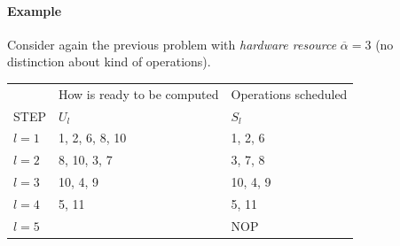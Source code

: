 \paragraph{Example}
Consider again the previous problem with \textit{hardware resource} $ \overline{\alpha} = 3 $ (no distinction about kind of operations).
\begin{center}
\begin{tabular}{l|l|l}
  \multicolumn{1}{l}{} & \multicolumn{1}{l}{How is ready to be computed}  & \multicolumn{1}{l}{Operations scheduled} \\
  STEP & $ U_{l} $  & $ S_{l} $ \\
  \hline
  $ l=1 $ & 1, 2, 6, 8, 10 & 1, 2, 6 \\
  \hline
  $ l=2 $ & 8, 10, 3, 7 & 3, 7, 8 \\
  \hline
  $ l=3 $ & 10, 4, 9 & 10, 4, 9 \\
  \hline
  $ l=4 $ & 5, 11 & 5, 11 \\
  \hline
  $ l=5 $ &  & NOP \\
\end{tabular}
\end{center}


